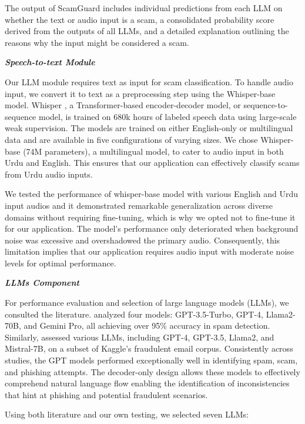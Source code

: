 \documentclass[11pt]{article}
\begin{document}
The output of ScamGuard includes individual predictions from each LLM on whether the text or audio input is a scam, a consolidated probability score derived from the outputs of all LLMs, and a detailed explanation outlining the reasons why the input might be considered a scam.

{\textbf{\textit{Speech-to-text Module }}}

Our LLM module requires text as input for scam classification. To handle audio input, we convert it to text as a preprocessing step using the Whisper-base model. Whisper \cite{radford2022robust}, a Transformer-based encoder-decoder model, or sequence-to-sequence model, is trained on 680k hours of labeled speech data using large-scale weak supervision. The models are trained on either English-only or multilingual data and are available in five configurations of varying sizes. We chose Whisper-base (74M parameters), a multilingual model, to cater to audio input in both Urdu and English. This ensures that our application can effectively classify scams from Urdu audio inputs.

We tested the performance of whisper-base model with various English and Urdu input audios and it demonstrated remarkable generalization across diverse domains without requiring fine-tuning, which is why we opted not to fine-tune it for our application. The model's performance only deteriorated when background noise was excessive and overshadowed the primary audio. Consequently, this limitation implies that our application requires audio input with moderate noise levels for optimal performance.

{\textbf{\textit{LLMs Component }}}

For performance evaluation and selection of large language models (LLMs), we consulted the literature. \cite{koide2024chatspamdetector} analyzed four models: GPT-3.5-Turbo, GPT-4, Llama2-70B, and Gemini Pro, all achieving over 95\% accuracy in spam detection. Similarly, \cite{patel2024largelanguagemodels} assessed various LLMs, including GPT-4, GPT-3.5, Llama2, and Mistral-7B, on a subset of Kaggle's fraudulent email corpus. Consistently across studies, the GPT models performed exceptionally well in identifying spam, scam, and phishing attempts. The decoder-only design  allows these models to effectively comprehend natural language flow enabling the identification of inconsistencies that hint at phishing and potential fraudulent scenarios.


Using both literature and our own testing, we selected seven LLMs:
\end{document}
